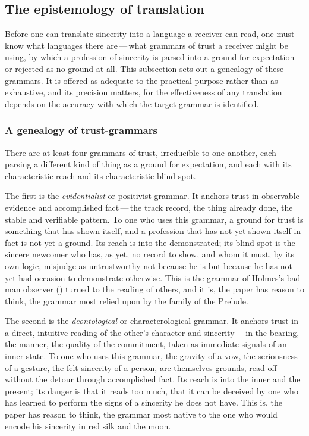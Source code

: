\subsection{The epistemology of translation}
\label{p13:sub:trans-epistemology}

Before one can translate sincerity into a language a receiver can read, one must know what languages there are\,---\,what grammars of trust a receiver might be using, by which a profession of sincerity is parsed into a ground for expectation or rejected as no ground at all. This subsection sets out a genealogy of these grammars. It is offered as adequate to the practical purpose rather than as exhaustive, and its precision matters, for the effectiveness of any translation depends on the accuracy with which the target grammar is identified.

\subsubsection{A genealogy of trust-grammars}
\label{p13:sub:trans-grammars}

There are at least four grammars of trust, irreducible to one another, each parsing a different kind of thing as a ground for expectation, and each with its characteristic reach and its characteristic blind spot.

The first is the \emph{evidentialist} or positivist grammar. It anchors trust in observable evidence and accomplished fact\,---\,the track record, the thing already done, the stable and verifiable pattern. To one who uses this grammar, a ground for trust is something that has shown itself, and a profession that has not yet shown itself in fact is not yet a ground. Its reach is into the demonstrated; its blind spot is the sincere newcomer who has, as yet, no record to show, and whom it must, by its own logic, misjudge as untrustworthy not because he is but because he has not yet had occasion to demonstrate otherwise. This is the grammar of Holmes's bad-man observer () turned to the reading of others, and it is, the paper has reason to think, the grammar most relied upon by the family of the Prelude.

The second is the \emph{deontological} or characterological grammar. It anchors trust in a direct, intuitive reading of the other's character and sincerity\,---\,in the bearing, the manner, the quality of the commitment, taken as immediate signals of an inner state. To one who uses this grammar, the gravity of a vow, the seriousness of a gesture, the felt sincerity of a person, are themselves grounds, read off without the detour through accomplished fact. Its reach is into the inner and the present; its danger is that it reads too much, that it can be deceived by one who has learned to perform the signs of a sincerity he does not have. This is, the paper has reason to think, the grammar most native to the one who would encode his sincerity in red silk and the moon.

